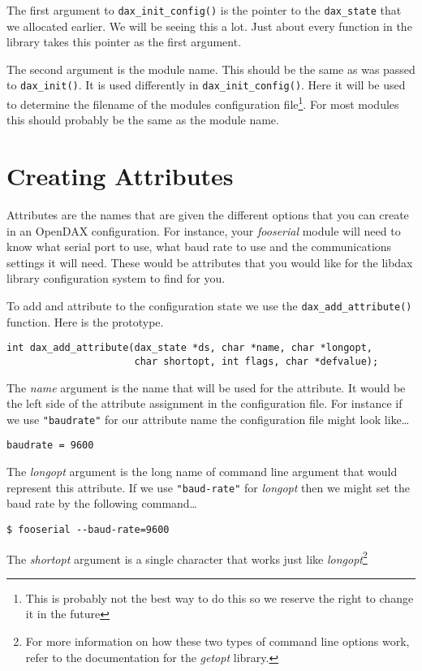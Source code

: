 The first argument to \verb|dax_init_config()| is the pointer to the \verb|dax_state| that we allocated earlier.  We will be seeing this a lot.  Just about every function in the library takes this pointer as the first argument.

The second argument is the module name.  This should be the same as was passed to \verb|dax_init()|.  It is used differently in \verb|dax_init_config()|.  Here it will be used to determine the filename of the modules configuration file\footnote{This is probably not the best way to do this so we reserve the right to change it in the future}.  For most modules this should probably be the same as the module name.

\section{Creating Attributes}
Attributes are the names that are given the different options that you can create in an OpenDAX configuration.  For instance, your \textit{fooserial} module will need to know what serial port to use, what baud rate to use and the communications settings it will need.  These would be attributes that you would like for the libdax library configuration system to find for you.

To add and attribute to the configuration state we use the \verb|dax_add_attribute()| function.  Here is the prototype.

\begin{verbatim}
int dax_add_attribute(dax_state *ds, char *name, char *longopt,
                      char shortopt, int flags, char *defvalue);
\end{verbatim}

The \textit{name} argument is the name that will be used for the attribute.  It would be the left side of the attribute assignment in the configuration file.  For instance if we use \texttt{"baudrate"} for our attribute name the configuration file might look like\ldots

\begin{verbatim}
baudrate = 9600
\end{verbatim}

The \textit{longopt} argument is the long name of command line argument that would represent this attribute.  If we use \texttt{"baud-rate"} for \textit{longopt} then we might set the baud rate by the following command\ldots

\begin{verbatim}
$ fooserial --baud-rate=9600
\end{verbatim}
The \textit{shortopt} argument is a single character that works just like \textit{longopt}\footnote{For more information on how these two types of command line options work, refer to the documentation for the \textit{getopt} library.}

